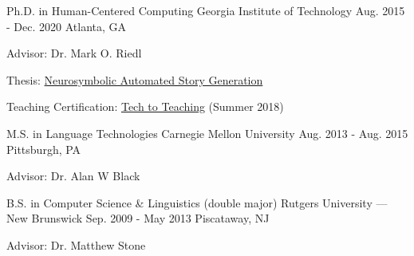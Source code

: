{\color{black}\fontsize{12pt}{1em}} 


\begin{cventries}

  \cventry
    {Ph.D. in Human-Centered Computing} %
    {Georgia Institute of Technology} %
    {Aug. 2015 - Dec. 2020} %
    {Atlanta, GA} %
    {
      \begin{cvitems} %
        \item {Advisor: Dr. Mark O. Riedl}
        \item {Thesis: \href{https://smartech.gatech.edu/handle/1853/64643}{Neurosymbolic Automated Story Generation}}
        \item{Teaching Certification: \href{https://www.ctl.gatech.edu/content/tech-teaching-0}{Tech to Teaching} (Summer 2018)}
      \end{cvitems}
    }



 \cventry
    {M.S. in Language Technologies} %
    {Carnegie Mellon University} %
    {Aug. 2013 - Aug. 2015} %
    {Pittsburgh, PA} %
    {      
      \begin{cvitems} %
        \item {Advisor: Dr. Alan W Black}
      \end{cvitems}
    }


  \cventry
    {B.S. in Computer Science \& Linguistics (double major)} %
    {Rutgers University --- New Brunswick} %
    {Sep. 2009 - May 2013} %
    {Piscataway, NJ} %
    {      
      \begin{cvitems} %
      \item {Advisor: Dr. Matthew Stone}
      \end{cvitems}
    }%
\end{cventries}
